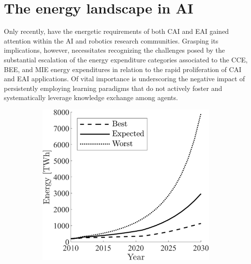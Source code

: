 \documentclass[12pt]{article}
\begin{document}
\section*{The energy landscape in AI}\label{sec:energy_grand_challenges}
Only recently, have the energetic requirements of both CAI and EAI gained attention within the AI and robotics research communities. Grasping its implications, however, necessitates recognizing the challenges posed by the substantial escalation of the energy expenditure categories associated to the CCE, BEE, and MIE energy expenditures in relation to the rapid proliferation of CAI and EAI applications. Of vital importance is underscoring the negative impact of persistently employing learning paradigms that do not actively foster and systematically leverage knowledge exchange among agents.
\begin{figure}[!t]
	\centering
	\hspace*{\fill}
	\begin{subfigure}[t]{0.32\textwidth}
		\subcaption{}
		\includegraphics[width= \textwidth]{data_center_energy_consumption.png} \label{fig:dataCenterEnergy}
	\end{subfigure}
	\hfill
	\begin{subfigure}[t]{0.32\textwidth}
		\subcaption{}

\end{subfigure}
\end{figure}
\end{document}
